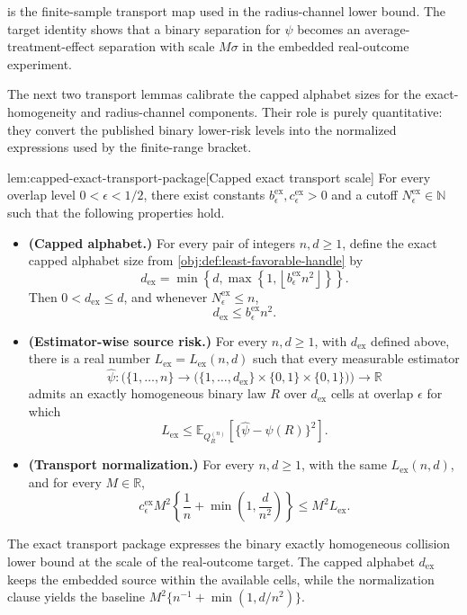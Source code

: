  is the finite-sample transport map used in the radius-channel lower bound. The target identity shows that a binary separation for \(\psi\) becomes an average-treatment-effect separation with scale \(M\sigma\) in the embedded real-outcome experiment.

The next two transport lemmas calibrate the capped alphabet sizes for the exact-homogeneity and radius-channel components. Their role is purely quantitative: they convert the published binary lower-risk levels into the normalized expressions used by the finite-range bracket.

\begin{lemmav}{lem:capped-exact-transport-package}[Capped exact transport scale]
For every overlap level \(0<\epsilon<1/2\), there exist constants
\(b_{\epsilon}^{\mathrm{ex}},c_{\epsilon}^{\mathrm{ex}}>0\) and a cutoff
\(N_{\epsilon}^{\mathrm{ex}}\in\mathbb N\) such that the following properties hold.
\begin{itemize}
\item \textbf{(Capped alphabet.)} For every pair of integers \(n,d\ge1\), define the exact capped alphabet size from \cref{obj:def:least-favorable-handle} by
\[
d_{\mathrm{ex}}
=
\min\left\{d,\max\left\{1,\left\lfloor b_{\epsilon}^{\mathrm{ex}}n^2\right\rfloor\right\}\right\}.
\]
Then \(0<d_{\mathrm{ex}}\le d\), and whenever \(N_{\epsilon}^{\mathrm{ex}}\le n\),
\[
d_{\mathrm{ex}}\le b_{\epsilon}^{\mathrm{ex}}n^2 .
\]

\item \textbf{(Estimator-wise source risk.)} For every \(n,d\ge1\), with \(d_{\mathrm{ex}}\) defined above, there is a real number \(L_{\mathrm{ex}}=L_{\mathrm{ex}}(n,d)\) such that every measurable estimator
\[
\widehat\psi:\bigl(\{1,\ldots,n\}\to \bigl(\{1,\ldots,d_{\mathrm{ex}}\}\times\{0,1\}\times\{0,1\}\bigr)\bigr)\to\mathbb R
\]
admits an exactly homogeneous binary law \(R\) over \(d_{\mathrm{ex}}\) cells at overlap \(\epsilon\) for which
\[
L_{\mathrm{ex}}
\le
\mathbb E_{Q_R^{(n)}}\!\left[
\{\widehat\psi-\psi(R)\}^2
\right].
\]

\item \textbf{(Transport normalization.)} For every \(n,d\ge1\), with the same \(L_{\mathrm{ex}}(n,d)\), and for every \(M\in\mathbb R\),
\[
c_{\epsilon}^{\mathrm{ex}}M^2
\left\{\frac1n+\min\left(1,\frac d{n^2}\right)\right\}
\le
M^2L_{\mathrm{ex}} .
\]
\end{itemize}
\end{lemmav}

The exact transport package expresses the binary exactly homogeneous collision lower bound at the scale of the real-outcome target. The capped alphabet \(d_{\mathrm{ex}}\) keeps the embedded source within the available cells, while the normalization clause yields the baseline \(M^2\{n^{-1}+\min(1,d/n^2)\}\).

